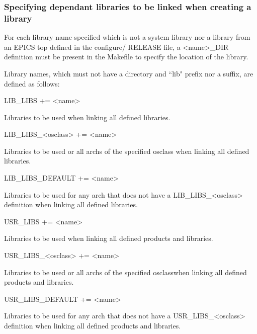 \subsubsection{Specifying dependant libraries to be linked when creating a library}

For each library name specified which is not a system library nor a library from an EPICS top defined in the configure/
RELEASE file, a \textless{}name\textgreater{}\_DIR definition must be present in the Makefile to specify the location of the library. 

Library names, which must not have a directory and ``lib" prefix nor a suffix, are defined as follows:

\begin{description}

\item {}LIB\_LIBS += \textless{}name\textgreater{}

Libraries to be used when linking all defined libraries.

\item LIB\_LIBS\_\textless{}osclass\textgreater{} += \textless{}name\textgreater{}

Libraries to be used or all archs of the specified osclass when linking all defined libraries.

\item LIB\_LIBS\_DEFAULT += \textless{}name\textgreater{}

Libraries to be used for any arch that does not have a LIB\_LIBS\_\textless{}osclass\textgreater{} definition when linking all 
defined libraries.

\item

\item {}USR\_LIBS += \textless{}name\textgreater{}

Libraries to be used when linking all defined products and libraries.

\item USR\_LIBS\_\textless{}osclass\textgreater{} += \textless{}name\textgreater{}

Libraries to be used or all archs of the specified osclasswhen linking all defined products and libraries.

\item USR\_LIBS\_DEFAULT += \textless{}name\textgreater{}

Libraries to be used for any arch that does not have a USR\_LIBS\_\textless{}osclass\textgreater{} definition when linking all 
defined products and libraries.


\end{description}
